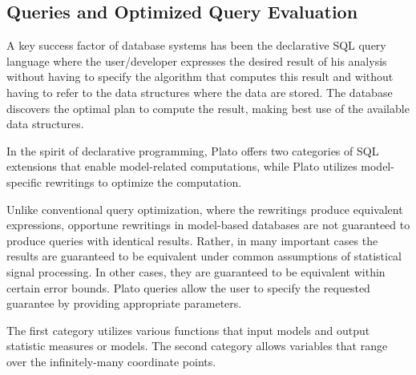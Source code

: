 

\subsection{Queries and Optimized Query Evaluation}
\label{sec:queries}
A key success factor of database systems has been the declarative SQL query language where the user/developer expresses the desired result of his analysis without having to specify the algorithm that computes this result and without having to refer to the data structures where the data are stored. The database discovers the optimal plan to compute the result, making best use of the available data structures. 

In the spirit of declarative programming, Plato offers two categories of SQL extensions that enable model-related computations, while Plato utilizes model-specific rewritings to optimize the computation. 

Unlike conventional query optimization, where the rewritings produce equivalent expressions, opportune rewritings in model-based databases are not guaranteed to produce queries with identical results. Rather, in many important cases the results are guaranteed to be equivalent under common assumptions of statistical signal processing. In other cases, they are guaranteed to be equivalent within certain error bounds. Plato queries allow the user to specify the requested guarantee by providing appropriate parameters.

The first category utilizes various functions that input models and output statistic measures or models. The second category allows variables that range over the infinitely-many coordinate points. 


